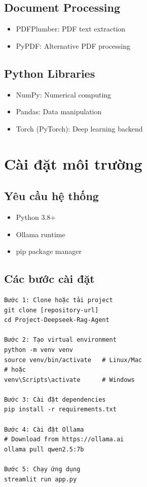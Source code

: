 \documentclass[12pt,a4paper]{report}
\begin{document}
\subsection{Document Processing}
\begin{itemize}
    \item PDFPlumber: PDF text extraction
    \item PyPDF: Alternative PDF processing
\end{itemize}

\subsection{Python Libraries}
\begin{itemize}
    \item NumPy: Numerical computing
    \item Pandas: Data manipulation
    \item Torch (PyTorch): Deep learning backend
\end{itemize}

\section{Cài đặt môi trường}

\subsection{Yêu cầu hệ thống}
\begin{itemize}
    \item Python 3.8+
    \item Ollama runtime
    \item pip package manager
\end{itemize}

\subsection{Các bước cài đặt}
\begin{lstlisting}
Bước 1: Clone hoặc tải project
git clone [repository-url]
cd Project-Deepseek-Rag-Agent

Bước 2: Tạo virtual environment
python -m venv venv
source venv/bin/activate   # Linux/Mac
# hoặc
venv\Scripts\activate      # Windows

Bước 3: Cài đặt dependencies
pip install -r requirements.txt

Bước 4: Cài đặt Ollama
# Download from https://ollama.ai
ollama pull qwen2.5:7b

Bước 5: Chạy ứng dụng
streamlit run app.py
\end{lstlisting}
\end{document}
